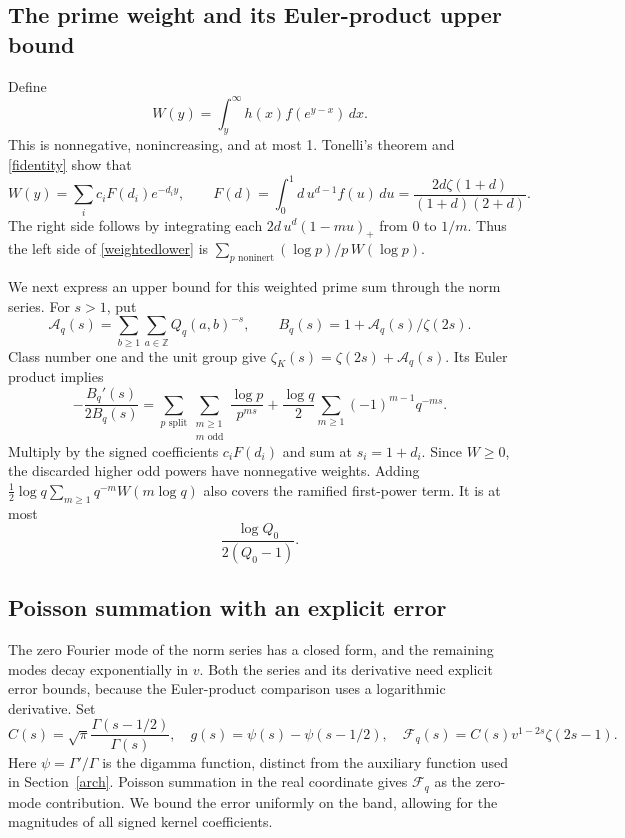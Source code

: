 \documentclass[11pt]{article}
\newcommand{\Z}{\mathbb Z}
\begin{document}
\subsection{The prime weight and its Euler-product upper bound}
Define
\[
 W(y)=\int_y^\infty h(x)f(e^{y-x})\,dx.
\]
This is nonnegative, nonincreasing, and at most 1. Tonelli's theorem
and \eqref{fidentity} show that
\begin{equation}\label{multiplier}
 W(y)=\sum_i c_i F(d_i)e^{-d_i y},\qquad
 F(d)=\int_0^1 d\,u^{d-1}f(u)\,du
       =\frac{2d\zeta(1+d)}{(1+d)(2+d)}.
\end{equation}
The right side follows by integrating each
\(2d\,u^d(1-mu)_+\) from 0 to \(1/m\).
Thus the left side of \eqref{weightedlower} is
\(\sum_{p\text{ noninert}}(\log p)/p\,W(\log p)\).

We next express an upper bound for this weighted prime sum through the
norm series. For \(s>1\), put
\[
 \mathcal A_q(s)=\sum_{b\ge1}\sum_{a\in\Z}Q_q(a,b)^{-s},\qquad
 B_q(s)=1+\mathcal A_q(s)/\zeta(2s).
\]
Class number one and the unit group give
\(\zeta_K(s)=\zeta(2s)+\mathcal A_q(s)\). Its Euler product implies
\[
 -\frac{B_q'(s)}{2B_q(s)}
 =\sum_{p\text{ split}}\sum_{\substack{m\ge1\\m\text{ odd}}}
      \frac{\log p}{p^{ms}}
 +\frac{\log q}{2}\sum_{m\ge1}(-1)^{m-1}q^{-ms}.
\]
Multiply by the signed coefficients \(c_iF(d_i)\) and sum at
\(s_i=1+d_i\). Since \(W\ge0\), the discarded higher odd powers
have nonnegative weights. Adding
\(\frac12\log q\sum_{m\ge1}q^{-m}W(m\log q)\) also covers the
ramified first-power term. It is at most
\begin{equation}\label{ramerror}
 \frac{\log Q_0}{2(Q_0-1)}.
\end{equation}

\subsection{Poisson summation with an explicit error}\label{poisson}
The zero Fourier mode of the norm series has a closed form, and the
remaining modes decay exponentially in \(v\). Both the series and
its derivative need explicit error bounds, because the Euler-product
comparison uses a logarithmic derivative.
Set
\[
 C(s)=\sqrt\pi\frac{\Gamma(s-1/2)}{\Gamma(s)},\quad
 g(s)=\psi(s)-\psi(s-1/2),\quad
 \mathcal F_q(s)=C(s)v^{1-2s}\zeta(2s-1).
\]
Here \(\psi=\Gamma'/\Gamma\) is the digamma function, distinct
from the auxiliary function used in Section~\ref{arch}.
Poisson summation in the real coordinate gives
\(\mathcal F_q\) as the zero-mode contribution. We bound the error
uniformly on the band, allowing for the magnitudes of all signed
kernel coefficients.
\end{document}
